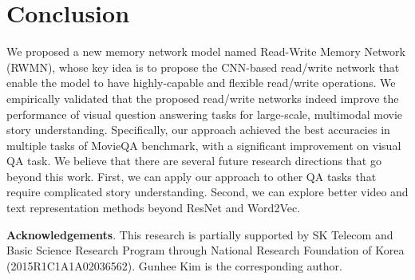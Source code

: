 \documentclass[10pt,twocolumn,letterpaper]{article}
\theoremstyle{nonumberplain}
\begin{document}
\section{Conclusion}

We proposed a new memory network model named Read-Write Memory Network (RWMN),
whose key idea is to propose the CNN-based read/write network that enable the model to have highly-capable and flexible read/write operations. 
We empirically validated that the proposed read/write networks indeed improve the performance of visual question answering tasks for large-scale, multimodal movie story understanding.
Specifically, our approach achieved the best accuracies in multiple tasks of MovieQA benchmark, with a significant improvement on visual QA task. 
We believe that there are several future research directions that go beyond this work. 
First, we can apply our approach to other QA tasks that require complicated story understanding. 
Second, we can explore better video and text representation methods beyond ResNet and Word2Vec. 

\textbf{Acknowledgements}.
This research is partially supported by SK Telecom and Basic Science Research Program through National Research Foundation of Korea (2015R1C1A1A02036562).
Gunhee Kim is the corresponding author.

{\small


}
\end{document}
